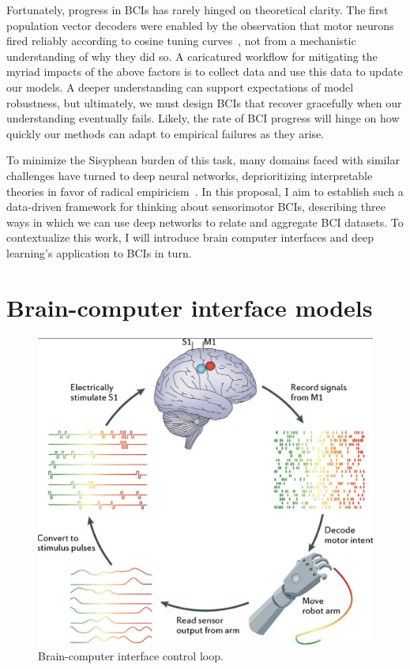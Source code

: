 \documentclass[12pt,oneside]{report}
\begin{document}
Fortunately, progress in BCIs has rarely hinged on theoretical clarity. The first population vector decoders were enabled by the observation that motor neurons fired reliably according to cosine tuning curves~\citep{Georgopoulos1986}, not from a mechanistic understanding of why they did so. A caricatured workflow for mitigating the myriad impacts of the above factors is to collect data and use this data to update our models. A deeper understanding can support expectations of model robustness, but ultimately, we must design BCIs that recover gracefully when our understanding eventually fails. Likely, the rate of BCI progress will hinge on how quickly our methods can adapt to empirical failures as they arise.

To minimize the Sisyphean burden of this task, many domains faced with similar challenges have turned to deep neural networks, deprioritizing interpretable theories in favor of radical empiricism~\citep{wang2023scientific}. In this proposal, I aim to establish such a data-driven framework for thinking about sensorimotor BCIs, describing three ways in which we can use deep networks to relate and aggregate BCI datasets. To contextualize this work, I will introduce brain computer interfaces and deep learning’s application to BCIs in turn.

\section{Brain-computer interface models}
\begin{figure}[h]
  \centering
  \includegraphics[width=0.9\linewidth]{ch1_bci_loop.png}
  \caption{Brain-computer interface control loop.}
  \label{fig:bci_loop}
\end{figure}
\end{document}
